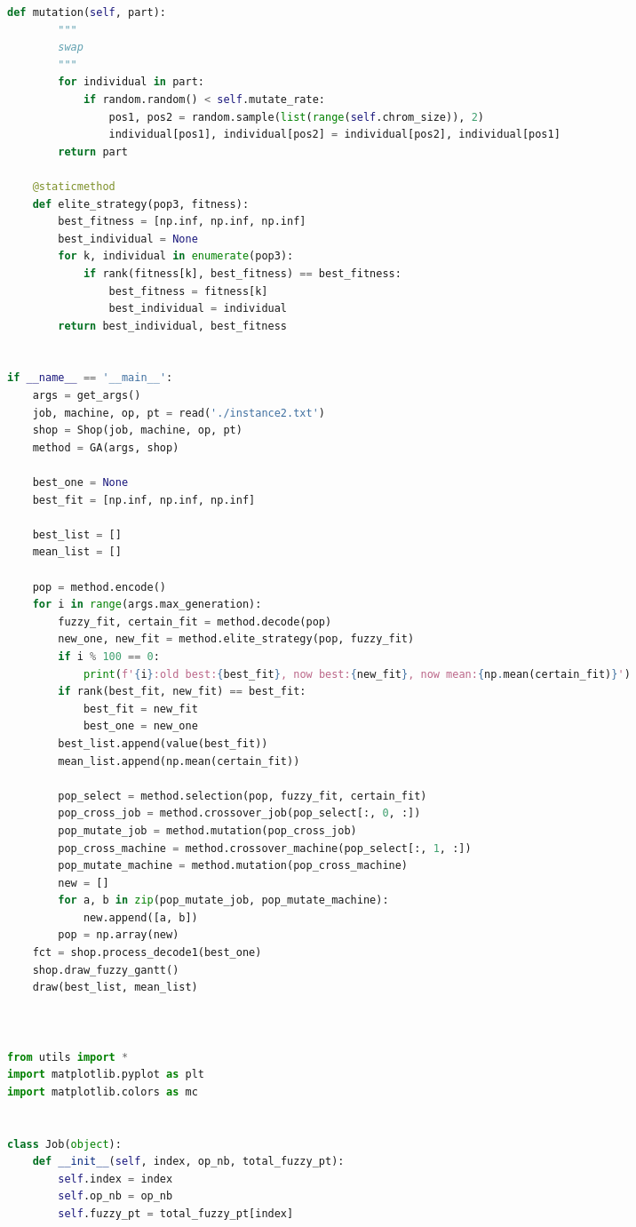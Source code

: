 \documentclass{whutmod}
\begin{document}
\begin{spacing}{1.2}
\begin{lstlisting}[language=python]
    def mutation(self, part):
        """
        swap
        """
        for individual in part:
            if random.random() < self.mutate_rate:
                pos1, pos2 = random.sample(list(range(self.chrom_size)), 2)
                individual[pos1], individual[pos2] = individual[pos2], individual[pos1]
        return part

    @staticmethod
    def elite_strategy(pop3, fitness):
        best_fitness = [np.inf, np.inf, np.inf]
        best_individual = None
        for k, individual in enumerate(pop3):
            if rank(fitness[k], best_fitness) == best_fitness:
                best_fitness = fitness[k]
                best_individual = individual
        return best_individual, best_fitness


if __name__ == '__main__':
    args = get_args()
    job, machine, op, pt = read('./instance2.txt')
    shop = Shop(job, machine, op, pt)
    method = GA(args, shop)

    best_one = None
    best_fit = [np.inf, np.inf, np.inf]

    best_list = []
    mean_list = []

    pop = method.encode()
    for i in range(args.max_generation):
        fuzzy_fit, certain_fit = method.decode(pop)
        new_one, new_fit = method.elite_strategy(pop, fuzzy_fit)
        if i % 100 == 0:
            print(f'{i}:old best:{best_fit}, now best:{new_fit}, now mean:{np.mean(certain_fit)}')
        if rank(best_fit, new_fit) == best_fit:
            best_fit = new_fit
            best_one = new_one
        best_list.append(value(best_fit))
        mean_list.append(np.mean(certain_fit))

        pop_select = method.selection(pop, fuzzy_fit, certain_fit)
        pop_cross_job = method.crossover_job(pop_select[:, 0, :])
        pop_mutate_job = method.mutation(pop_cross_job)
        pop_cross_machine = method.crossover_machine(pop_select[:, 1, :])
        pop_mutate_machine = method.mutation(pop_cross_machine)
        new = []
        for a, b in zip(pop_mutate_job, pop_mutate_machine):
            new.append([a, b])
        pop = np.array(new)
    fct = shop.process_decode1(best_one)
    shop.draw_fuzzy_gantt()
    draw(best_list, mean_list)



from utils import *
import matplotlib.pyplot as plt
import matplotlib.colors as mc


class Job(object):
    def __init__(self, index, op_nb, total_fuzzy_pt):
        self.index = index
        self.op_nb = op_nb
        self.fuzzy_pt = total_fuzzy_pt[index]


\end{lstlisting}
\end{spacing}
\end{document}
